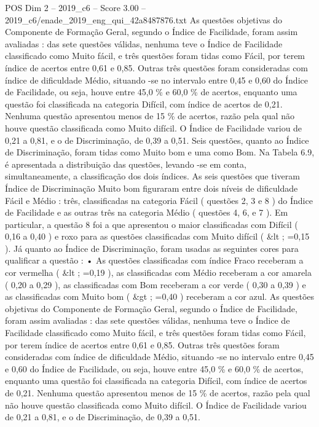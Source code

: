 \begin{textsample}{POS Dim 2 – 2019\_c6 – Score 3.00 – 2019\_c6/enade\_2019\_eng\_qui\_42a8487876.txt}
As questões objetivas do Componente de Formação Geral, segundo o Índice de Facilidade, foram assim avaliadas : das sete questões válidas, nenhuma teve o Índice de Facilidade classificado como Muito fácil, e três questões foram tidas como Fácil, por terem índice de acertos entre 0,61 e 0,85.
Outras três questões foram consideradas com índice de dificuldade Médio, situando -se no intervalo entre 0,45 e 0,60 do Índice de Facilidade, ou seja, houve entre 45,0 \% e 60,0 \% de acertos, enquanto uma questão foi classificada na categoria Difícil, com índice de acertos de 0,21.
Nenhuma questão apresentou menos de 15 \% de acertos, razão pela qual não houve questão classificada como Muito difícil.
O Índice de Facilidade variou de 0,21 a 0,81, e o de Discriminação, de 0,39 a 0,51.
Seis questões, quanto ao Índice de Discriminação, foram tidas como Muito bom e uma como Bom.
Na Tabela 6.9, é apresentada a distribuição das questões, levando -se em conta, simultaneamente, a classificação dos dois índices.
As seis questões que tiveram Índice de Discriminação Muito bom figuraram entre dois níveis de dificuldade Fácil e Médio : três, classificadas na categoria Fácil ( questões 2, 3 e 8 ) do Índice de Facilidade e as outras três na categoria Médio ( questões 4, 6, e 7 ).
Em particular, a questão 8 foi a que apresentou o maior classificadas com Difícil ( 0,16 a 0,40 ) e roxo para as questões classificadas com Muito difícil ( \&lt ; =0,15 ).
Já quanto ao Índice de Discriminação, foram usadas as seguintes cores para qualificar a questão : • As questões classificadas com índice Fraco receberam a cor vermelha ( \&lt ; =0,19 ), as classificadas com Médio receberam a cor amarela ( 0,20 a 0,29 ), as classificadas com Bom receberam a cor verde ( 0,30 a 0,39 ) e as classificadas com Muito bom ( \&gt ; =0,40 ) receberam a cor azul.
As questões objetivas do Componente de Formação Geral, segundo o Índice de Facilidade, foram assim avaliadas : das sete questões válidas, nenhuma teve o Índice de Facilidade classificado como Muito fácil, e três questões foram tidas como Fácil, por terem índice de acertos entre 0,61 e 0,85.
Outras três questões foram consideradas com índice de dificuldade Médio, situando -se no intervalo entre 0,45 e 0,60 do Índice de Facilidade, ou seja, houve entre 45,0 \% e 60,0 \% de acertos, enquanto uma questão foi classificada na categoria Difícil, com índice de acertos de 0,21.
Nenhuma questão apresentou menos de 15 \% de acertos, razão pela qual não houve questão classificada como Muito difícil.
O Índice de Facilidade variou de 0,21 a 0,81, e o de Discriminação, de 0,39 a 0,51.

\end{textsample}

